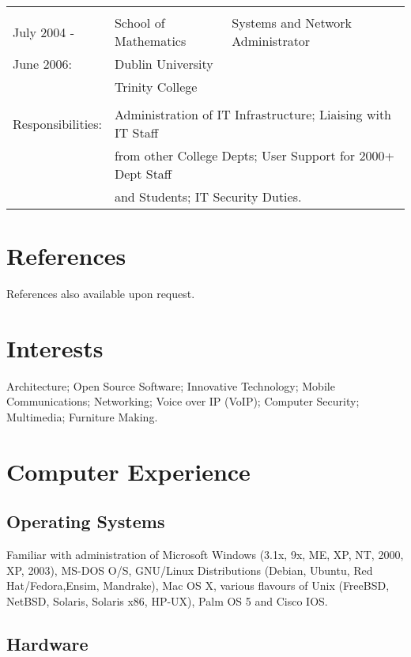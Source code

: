 \documentclass[a4paper, 11pt] {article}
\begin{document}
\begin{tabular}{llll}
						&												&\\
July 2004 -			& 	School of Mathematics	&	Systems and Network Administrator &	\\
June 2006:			& 	Dublin University			&	&	\\
						& 	Trinity College			&	&	\\
						& 									&	&	\\
Responsibilities:	& \multicolumn{3}{l}{Administration of IT Infrastructure; Liaising with IT Staff}	\\ 
						& \multicolumn{3}{l}{from other College Depts; User Support for 2000+ Dept Staff}	\\
						& \multicolumn{3}{l}{and Students; IT Security Duties.} 	\\
\end{tabular}

\section*{References}

References also available upon request.

\section*{Interests}

Architecture; Open Source Software; Innovative Technology; 
Mobile Communications;  Networking; Voice over IP (VoIP); 
Computer Security; Multimedia; Furniture Making.

\section*{Computer Experience}

\subsection*{Operating Systems}

Familiar with administration of Microsoft Windows (3.1x, 9x, 
ME, XP, NT, 2000, XP, 2003), MS-DOS O/S, GNU/Linux Distributions 
(Debian, Ubuntu, Red Hat/Fedora,Ensim, Mandrake), Mac OS X, various
flavours of Unix (FreeBSD, NetBSD, Solaris, Solaris x86, HP-UX), 
Palm OS 5 and Cisco IOS.

\subsection*{Hardware}
\end{document}

